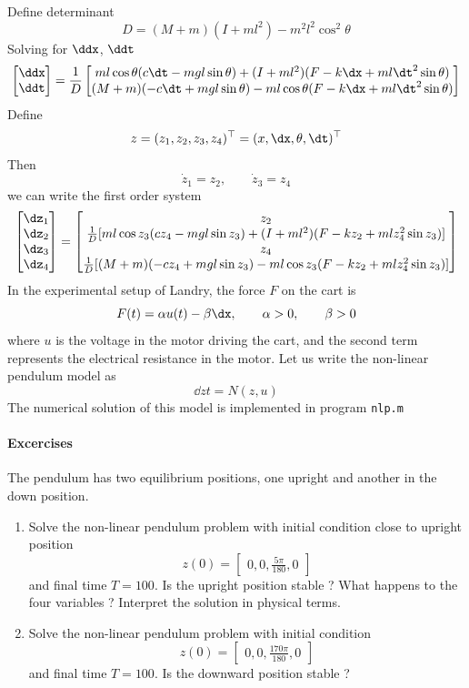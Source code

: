 \documentclass[12pt]{article}
\begin{document}
Define determinant
\[
D = (M+m)(I+ml^2) - m^2 l^2 \cos^2\theta
\]
Solving for $\ddx$, $\ddt$
\[
\begin{bmatrix}
\ddx \\ \ddt \end{bmatrix} = \frac{1}{D} \begin{bmatrix}
m l \cos\theta (c \dt - mgl\sin\theta) + (I+ml^2)(F - k\dx + ml\dt^2 \sin\theta) \\
(M+m)(-c\dt + mgl\sin\theta) - ml\cos\theta(F - k\dx + ml\dt^2 \sin\theta)
\end{bmatrix}
\]
Define
\[
z = (z_1, z_2, z_3, z_4)^\top = (x, \dx, \theta, \dt)^\top
\]
Then
\[
\dot{z}_1 = z_2, \qquad \dot{z}_3 = z_4
\]
we can write the first order system
\[
\begin{bmatrix}
\dz_1 \\ \dz_2 \\ \dz_3 \\ \dz_4 \end{bmatrix} = \begin{bmatrix}
z_2 \\
\frac{1}{D} [ m l \cos z_3 (c z_4 - mgl\sin z_3) + (I+ml^2)(F - k z_2 + ml z_4^2 \sin      z_3)] \\
z_4 \\
\frac{1}{D}[ (M+m)(-c z_4 + mgl\sin z_3) - ml\cos z_3 (F - k z_2 + ml z_4^2 \sin z_3)]
\end{bmatrix}
\]
In the experimental setup of Landry, the force $F$ on the cart is
\[
F(t) = \alpha u(t) - \beta \dx, \qquad \alpha > 0, \qquad \beta > 0
\]
where $u$ is the voltage in the motor driving the cart, and the second term represents the electrical resistance in the motor. Let us write the non-linear pendulum model as
\[
\dd{z}{t} = N(z,u)
\]
The numerical solution of this model is implemented in program {\tt nlp.m}
\paragraph{Excercises}
The pendulum has two equilibrium positions, one upright and another in the down position.
\begin{enumerate}
\item Solve the non-linear pendulum problem with initial condition close to upright position 
\[
z(0) = \begin{bmatrix} 0, 0, \frac{5\pi}{180}, 0 \end{bmatrix}
\]
and final time $T=100$. Is the upright position stable ? What happens to the four variables ? Interpret the solution in physical terms.

\item Solve the non-linear pendulum problem with initial condition 
\[
z(0) = \begin{bmatrix} 0, 0, \frac{170\pi}{180}, 0 \end{bmatrix}
\]
and final time $T=100$. Is the downward position stable ?

\end{enumerate}
\end{document}

